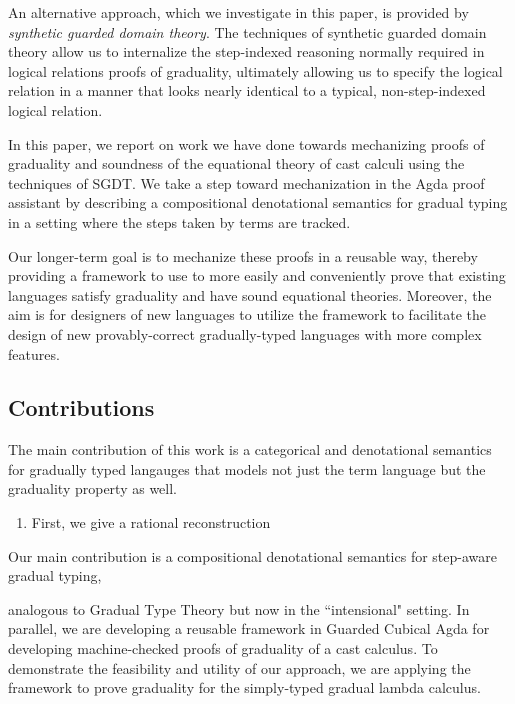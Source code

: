 An alternative approach, which we investigate in this paper, is provided by
\emph{synthetic guarded domain theory}\cite{birkedal-mogelberg-schwinghammer-stovring2011}.
The techniques of synthetic guarded domain theory allow us to internalize the
step-indexed reasoning normally required in logical relations proofs of graduality,
ultimately allowing us to specify the logical relation in a manner that looks nearly
identical to a typical, non-step-indexed logical relation.

In this paper, we report on work we have done towards mechanizing proofs of graduality
and soundness of the equational theory of cast calculi using the techniques of SGDT.
We take a step toward mechanization in the Agda proof assistant by describing a compositional
denotational semantics for gradual typing in a setting where the steps taken by terms are tracked.

Our longer-term goal is to mechanize these proofs in a reusable way, thereby providing a framework
to use to more easily and conveniently prove that existing languages satisfy graduality and have
sound equational theories. Moreover, the aim is for designers of new languages to utilize the
framework to facilitate the design of new provably-correct gradually-typed languages with more
complex features.


\subsection{Contributions}

The main contribution of this work is a categorical and denotational
semantics for gradually typed langauges that models not just the term
language but the graduality property as well.
\begin{enumerate}
\item First, we give a rational reconstruction 
\end{enumerate}

Our main contribution is a compositional denotational semantics for step-aware gradual typing,

analogous to Gradual Type Theory but now in the ``intensional" setting.
In parallel, we are developing a reusable framework in
Guarded Cubical Agda for developing machine-checked proofs of graduality of a cast calculus.
To demonstrate the feasibility and utility of our approach, we are applying the framework
to prove graduality for the simply-typed gradual lambda calculus.


